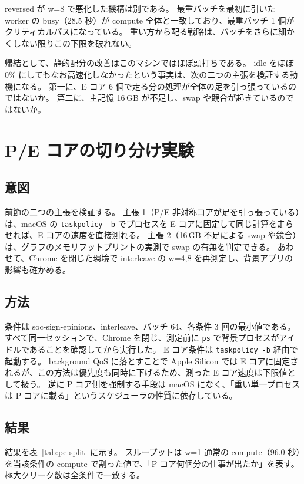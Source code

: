reversed が w=8 で悪化した機構は別である。
最重バッチを最初に引いた worker の busy（28.5 秒）が compute 全体と一致しており、最重バッチ 1 個がクリティカルパスになっている。
重い方から配る戦略は、バッチをさらに細かくしない限りこの下限を破れない。

帰結として、静的配分の改善はこのマシンではほぼ頭打ちである。
idle をほぼ 0\% にしてもなお高速化しなかったという事実は、次の二つの主張を検証する動機になる。
第一に、E コア 6 個で走る分の処理が全体の足を引っ張っているのではないか。
第二に、主記憶 16\,GB が不足し、swap や競合が起きているのではないか。

\section{P/E コアの切り分け実験}
\label{sec:pe-split}

\subsection{意図}

前節の二つの主張を検証する。
主張 1（P/E 非対称コアが足を引っ張っている）は、macOS の \texttt{taskpolicy -b} でプロセスを E コアに固定して同じ計算を走らせれば、E コアの速度を直接測れる。
主張 2（16\,GB 不足による swap や競合）は、グラフのメモリフットプリントの実測で swap の有無を判定できる。
あわせて、Chrome を閉じた環境で interleave の w=4,8 を再測定し、背景アプリの影響も確かめる。

\subsection{方法}

条件は soc-sign-epinions、interleave、バッチ 64、各条件 3 回の最小値である。
すべて同一セッションで、Chrome を閉じ、測定前に \texttt{ps} で背景プロセスがアイドルであることを確認してから実行した。
E コア条件は \texttt{taskpolicy -b} 経由で起動する。
background QoS に落とすことで Apple Silicon では E コアに固定されるが、この方法は優先度も同時に下げるため、測った E コア速度は下限値として扱う。
逆に P コア側を強制する手段は macOS になく、「重い単一プロセスは P コアに載る」というスケジューラの性質に依存している。

\subsection{結果}

結果を表~\ref{tab:pe-split} に示す。
スループットは w=1 通常の compute（96.0 秒）を当該条件の compute で割った値で、「P コア何個分の仕事が出たか」を表す。
極大クリーク数は全条件で一致する。

